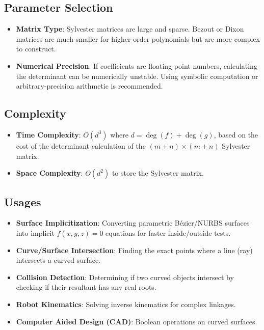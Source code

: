 \subsection{Parameter Selection}
\begin{itemize}
    \item \textbf{Matrix Type}: Sylvester matrices are large and sparse. Bezout or Dixon matrices are much smaller for higher-order polynomials but are more complex to construct.
    \item \textbf{Numerical Precision}: If coefficients are floating-point numbers, calculating the determinant can be numerically unstable. Using symbolic computation or arbitrary-precision arithmetic is recommended.
\end{itemize}

\subsection{Complexity}
\begin{itemize}
    \item \textbf{Time Complexity}: $O(d^3)$ where $d = \deg(f) + \deg(g)$, based on the cost of the determinant calculation of the $(m+n) \times (m+n)$ Sylvester matrix.
    \item \textbf{Space Complexity}: $O(d^2)$ to store the Sylvester matrix.
\end{itemize}

\subsection{Usages}
\begin{itemize}
    \item \textbf{Surface Implicitization}: Converting parametric B\'ezier/NURBS surfaces into implicit $f(x, y, z) = 0$ equations for faster inside/outside tests.
    \item \textbf{Curve/Surface Intersection}: Finding the exact points where a line (ray) intersects a curved surface.
    \item \textbf{Collision Detection}: Determining if two curved objects intersect by checking if their resultant has any real roots.
    \item \textbf{Robot Kinematics}: Solving inverse kinematics for complex linkages.
    \item \textbf{Computer Aided Design (CAD)}: Boolean operations on curved surfaces.
\end{itemize}

